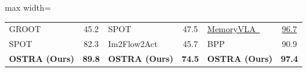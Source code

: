\begin{table}[t]
\begin{adjustbox}{max width=\textwidth}
\begin{tabular}{lc|lc|lc}
        GROOT~\citep{zhu2023learning} & 45.2 &
        SPOT~\citep{Hsu2025SPOT} & 47.5 &
        \underline{MemoryVLA~\citep{shi2025memoryvla}} & \underline{96.7} \\
        SPOT~\citep{Hsu2025SPOT} & 82.3 &
        Im2Flow2Act~\citep{xu2024im2flow2act} & 45.7 &
        BPP~\citep{Mark2026BPP} & 90.9 \\
        \rowcolor{tablehead}
        \textbf{OSTRA (Ours)} & \textbf{89.8} &
        \textbf{OSTRA (Ours)} & \textbf{74.5} &
        \textbf{OSTRA (Ours)} & \textbf{97.4} \\
        \bottomrule
    \end{tabular}
    \end{adjustbox}
    \vspace{-8pt}
\end{table}
